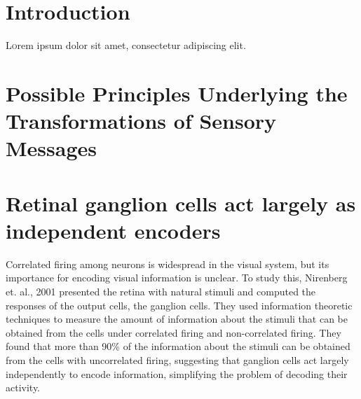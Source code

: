 \documentclass[twoside]{article}
\begin{document}
\begin{multicols}{2} %

\section{Introduction}

\lettrine[nindent=0em,lines=3]{L} orem ipsum dolor sit amet, consectetur adipiscing elit.






\section{Possible Principles Underlying the Transformations of Sensory Messages}







\section{Retinal ganglion cells act largely as independent encoders}

\footnotesize
Correlated firing among neurons is widespread in the visual system, but its importance for encoding visual information is unclear. To study this, Nirenberg et. al., 2001 presented the retina with natural stimuli and computed the responses of the output cells, the ganglion cells. They used information theoretic techniques to measure the amount of information about the stimuli that can be obtained from the cells under correlated firing and non-correlated firing. They found that more than 90\% of the information about the stimuli can be obtained from the cells with uncorrelated firing, suggesting that ganglion cells act largely independently to encode information, simplifying the problem of decoding their activity. 


\end{multicols}
\end{document}
